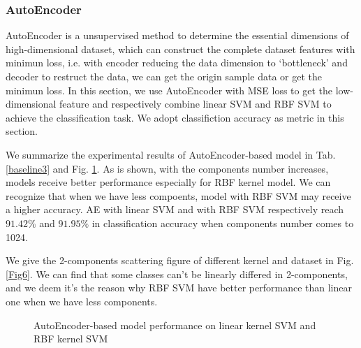 \documentclass{article}
\begin{document}
\subsubsection{AutoEncoder}
AutoEncoder is a unsupervised method to determine the essential dimensions of high-dimensional dataset, which can construct the complete dataset features with minimun loss, i.e. with encoder reducing the data dimension to `bottleneck' and decoder to restruct the data, we can get the origin sample data or get the minimun loss. In this section, we use AutoEncoder with MSE loss to get the low-dimensional feature and respectively combine linear SVM and RBF SVM to achieve the classification task. We adopt classifiction accuracy as metric in this section.

We summarize the experimental results of AutoEncoder-based model in Tab. \ref{baseline3} and Fig. \ref{Fig5}. As is shown, with the components number increases, models receive better performance especially for RBF kernel model. We can recognize that when we have less compoents, model with RBF SVM may receive a higher accuracy. AE with linear SVM and with RBF SVM respectively reach $91.42\%$ and $91.95\%$ in classification accuracy when components number comes to 1024.

We give the 2-components scattering figure of different kernel and dataset in Fig. \ref{Fig6}. We can find that some classes can't be linearly differed in 2-components, and we deem it's the reason why RBF SVM have better performance than linear one when we have less components.

\begin{center}
\begin{figure}[htbp]
\centering
{}
\quad
{}
\caption{AutoEncoder-based model performance on linear kernel SVM and RBF kernel SVM}
\label{Fig5}
\end{figure}
\end{center}
\end{document}
